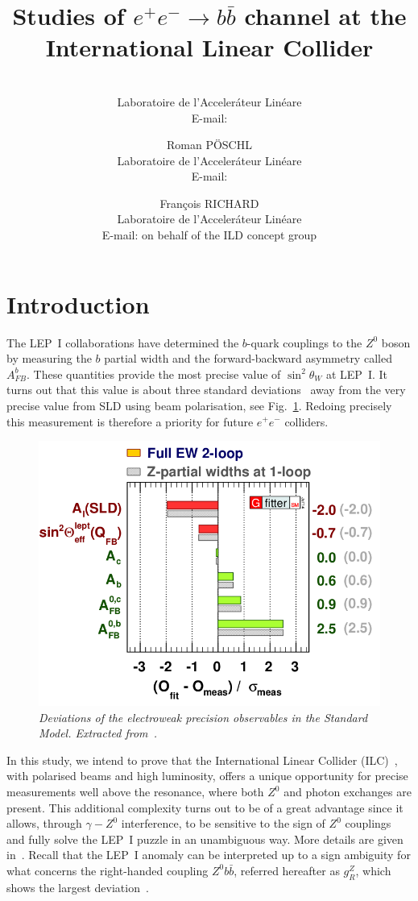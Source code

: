\documentclass{PoS}
\title{Studies of $ e^+e^-\to b\bar{b}$ channel at the International Linear Collider}
\author{\speaker{Sviatoslav BILOKIN}\\%
        Laboratoire de l'Acceler\'ateur Lin\'eare\\
        E-mail: \email{bilokin@lal.in2p3.fr}}
\author{Roman P\"OSCHL\\
        Laboratoire de l'Acceler\'ateur Lin\'eare\\
        E-mail: \email{poeschl@lal.in2p3.fr}}
\author{Fran\c cois RICHARD\\
	Laboratoire de l'Acceler\'ateur Lin\'eare\\
	E-mail: \email{richard@lal.in2p3.fr\\
		\\}
	\hspace{20pt}on behalf of the ILD concept group}
\newcommand{\afb}{$A_{FB}^b$}
\begin{document}
\section{Introduction}
The LEP~I collaborations have determined the $b$-quark couplings to the $Z^0$ boson by measuring the $b$ partial width and the forward-backward asymmetry called \afb. These quantities provide the most precise value of $\sin^2\theta_W$ at LEP~I. It turns out that this value is about three standard deviations~\cite{Baak:2014ora} away from the very precise value from SLD using beam polarisation, see Fig.~\ref{fig:ewfit}. Redoing precisely this measurement is therefore a priority for future $e^+e^-$ colliders. 


\begin{figure}
	{\centering
		\includegraphics[width=0.45\linewidth]{../poster/figures/deviation2.png}
		\caption{\sl Deviations of the electroweak precision
			observables in the Standard Model. Extracted from~\cite{Baak:2014ora}. }
		\label{fig:ewfit}
	}
\end{figure}

In this study, we intend to prove that the International Linear Collider (ILC)~\cite{Behnke:2013xla}, with {polarised beams and high luminosity}, offers a unique opportunity for precise measurements well above the resonance, where both $Z^0$ and photon exchanges are present. 
This additional complexity turns out to be of a great advantage since it allows, through $\gamma - Z^0$ interference, to be sensitive to the sign of $Z^0$ couplings and fully solve the LEP~I puzzle in an unambiguous way. 
More details are given in~\cite{Bilokin:2017lco}.
Recall that the LEP~I anomaly can be interpreted up to a sign ambiguity for what concerns the right-handed coupling $Z^0 b\bar{b}$, referred hereafter as $g_R^Z$, which shows the largest deviation~\cite{Djouadi:2006rk}.
\end{document}
